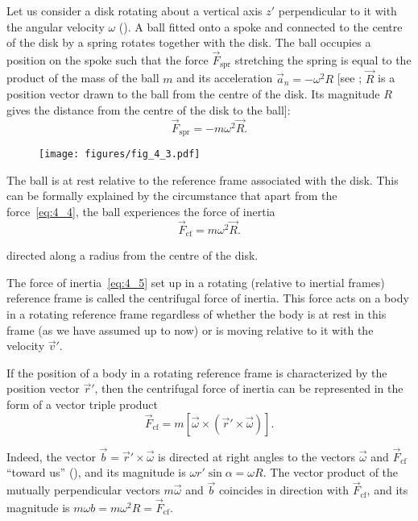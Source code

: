 Let us consider a disk rotating about a vertical axis $z'$ perpendicular to it with the angular velocity $\omega$ (). A ball fitted onto a spoke and connected to the centre of the disk by a spring rotates together with the disk. The ball occupies a position on the spoke such that the force $\vec{F}_{\text{spr}}$ stretching the spring is equal to the product of the mass of the ball $m$ and its acceleration $\vec{a}_n = -\omega^2R$ [see ; $\vec{R}$ is a position vector drawn to the ball from the centre of the disk. Its magnitude $R$ gives the distance from the centre of the disk to the ball]:
\begin{equation}\label{eq:4_4}
\vec{F}_{\text{spr}} = -m\omega^2\vec{R}.
\end{equation}

\begin{figure}[t]
	\begin{center}
		\texttt{[image: figures/fig\_4\_3.pdf]}
		\caption[]{}
		\label{fig:4_3}
	\end{center}
\end{figure}

The ball is at rest relative to the reference frame associated with the disk. This can be formally explained by the circumstance that apart from the force~\eqref{eq:4_4}, the ball experiences the force of inertia
\begin{equation}\label{eq:4_5}
\vec{F}_{\text{cf}} = m\omega^2\vec{R}.
\end{equation}

\noindent
directed along a radius from the centre of the disk.

The force of inertia~\eqref{eq:4_5} set up in a rotating (relative to inertial frames) reference frame is called the centrifugal force of inertia. This force acts on a body in a rotating reference frame regardless of whether the body is at rest in this frame (as we have assumed up to now) or is moving relative to it with the velocity $\vec{v}'$.

If the position of a body in a rotating reference frame is characterized by the position vector $\vec{r}'$, then the centrifugal force of inertia can be represented in the form of a vector triple product
\begin{equation}\label{eq:4_6}
\vec{F}_{\text{cf}} = m [\vec{\omega} \times (\vec{r}'\times\vec{\omega})].
\end{equation}

\noindent
Indeed, the vector $\vec{b}=\vec{r}'\times\vec{\omega}$ is directed at right angles to the vectors $\vec{\omega}$ and $\vec{F}_{\text{cf}}$ ``toward us'' (), and its magnitude is $\omega r'\sin\alpha=\omega R$. The vector product of the mutually perpendicular vectors $m\vec{\omega}$ and $\vec{b}$ coincides in direction with $\vec{F}_{\text{cf}}$, and its magnitude is $m\omega b=m\omega^2R=\vec{F}_{\text{cf}}$.

